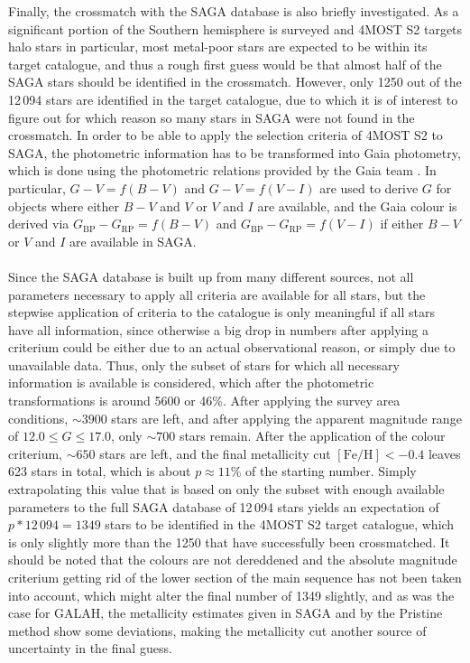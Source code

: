 \documentclass[a4paper,11pt]{article}
\begin{document}
Finally, the crossmatch with the SAGA database is also briefly investigated. As a significant portion of the Southern hemisphere is surveyed and 4MOST S2 targets halo stars in particular, most metal-poor stars are expected to be within its target catalogue, and thus a rough first guess would be that almost half of the SAGA stars should be identified in the crossmatch. However, only 1250 out of the 12\,094 stars are identified in the target catalogue, due to which it is of interest to figure out for which reason so many stars in SAGA were not found in the crossmatch. In order to be able to apply the selection criteria of 4MOST S2 to SAGA, the photometric information has to be transformed into Gaia photometry, which is done using the photometric relations provided by the Gaia team \citep[\href{https://gea.esac.esa.int/archive/documentation/GEDR3/Data_processing/chap_cu5pho/cu5pho_sec_photSystem/cu5pho_ssec_photRelations.html}{Gaia (E)DR3 Documentation, Chapter 5.5.1};][]{photrel}. In particular, $G-V=f(B-V)$ and $G-V=f(V-I)$ are used to derive $G$ for objects where either $B-V$ and $V$ or $V$ and $I$ are available, and the Gaia colour is derived via $G_\mathrm{BP}-G_\mathrm{RP}=f(B-V)$ and $G_\mathrm{BP}-G_\mathrm{RP}=f(V-I)$ if either $B-V$ or $V$ and $I$ are available in SAGA.\\ \\
%
Since the SAGA database is built up from many different sources, not all parameters necessary to apply all criteria are available for all stars, but the stepwise application of criteria to the catalogue is only meaningful if all stars have all information, since otherwise a big drop in numbers after applying a criterium could be either due to an actual observational reason, or simply due to unavailable data. Thus, only the subset of stars for which all necessary information is available is considered, which after the photometric transformations is around 5600 or 46\%. After applying the survey area conditions, ${\sim}3900$ stars are left, and after applying the apparent magnitude range of $12.0\leq G\leq17.0$, only ${\sim}700$ stars remain. After the application of the colour criterium, ${\sim}650$ stars are left, and the final metallicity cut $\mathrm{[Fe/H]}<-0.4$ leaves 623 stars in total, which is about $p\approx11$\% of the starting number. Simply extrapolating this value that is based on only the subset with enough available parameters to the full SAGA database of 12\,094 stars yields an expectation of $p*12\,094=1349$ stars to be identified in the 4MOST S2 target catalogue, which is only slightly more than the 1250 that have successfully been crossmatched. It should be noted that the colours are not dereddened and the absolute magnitude criterium getting rid of the lower section of the main sequence has not been taken into account, which might alter the final number of 1349 slightly, and as was the case for GALAH, the metallicity estimates given in SAGA and by the Pristine method show some deviations, making the metallicity cut another source of uncertainty in the final guess.\\ \\
\end{document}
